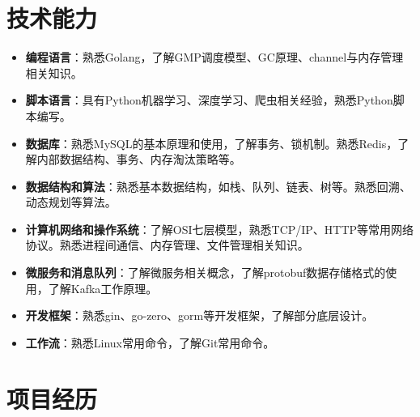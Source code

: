 \documentclass{resume}
\begin{document}
\section[技术能力]{技术能力}
\begin{itemize}
  \item \textbf{编程语言}：熟悉Golang，了解GMP调度模型、GC原理、channel与内存管理相关知识。
  \item \textbf{脚本语言}：具有Python机器学习、深度学习、爬虫相关经验，熟悉Python脚本编写。
  \item \textbf{数据库}：熟悉MySQL的基本原理和使用，了解事务、锁机制。熟悉Redis，了解内部数据结构、事务、内存淘汰策略等。
  \item \textbf{数据结构和算法}：熟悉基本数据结构，如栈、队列、链表、树等。熟悉回溯、动态规划等算法。
  \item \textbf{计算机网络和操作系统}：了解OSI七层模型，熟悉TCP/IP、HTTP等常用网络协议。熟悉进程间通信、内存管理、文件管理相关知识。
  \item \textbf{微服务和消息队列}：了解微服务相关概念，了解protobuf数据存储格式的使用，了解Kafka工作原理。
  \item \textbf{开发框架}：熟悉gin、go-zero、gorm等开发框架，了解部分底层设计。
  \item \textbf{工作流}：熟悉Linux常用命令，了解Git常用命令。
\end{itemize}




\section{项目经历}
\end{document}

